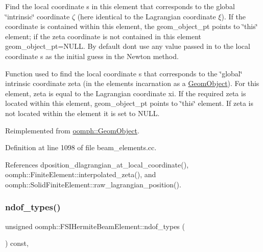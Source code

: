 Find the local coordinate s in this element that corresponds to the global \char`\"{}intrinsic\char`\"{} coordinate $ \zeta $ (here identical to the Lagrangian coordinate $ \xi $). If the coordinate is contained within this element, the geom\+\_\+object\+\_\+pt points to \char`\"{}this\char`\"{} element; if the zeta coordinate is not contained in this element geom\+\_\+object\+\_\+pt=N\+U\+LL. By default don\textquotesingle{}t use any value passed in to the local coordinate s as the initial guess in the Newton method. 

Function used to find the local coordinate s that corresponds to the \char`\"{}global\char`\"{} intrinsic coordinate zeta (in the element\textquotesingle{}s incarnation as a \hyperlink{classoomph_1_1GeomObject}{Geom\+Object}). For this element, zeta is equal to the Lagrangian coordinate xi. If the required zeta is located within this element, geom\+\_\+object\+\_\+pt points to \char`\"{}this\char`\"{} element. If zeta is not located within the element it is set to N\+U\+LL. 

Reimplemented from \hyperlink{classoomph_1_1GeomObject_a78ee9f98bcfd0c5e1f07a459777663d3}{oomph\+::\+Geom\+Object}.



Definition at line 1098 of file beam\+\_\+elements.\+cc.



References dposition\+\_\+dlagrangian\+\_\+at\+\_\+local\+\_\+coordinate(), oomph\+::\+Finite\+Element\+::interpolated\+\_\+zeta(), and oomph\+::\+Solid\+Finite\+Element\+::raw\+\_\+lagrangian\+\_\+position().

\mbox{\label{classoomph_1_1FSIHermiteBeamElement_a61ce78842e8e4d60b9f015eee813e162}} 
\subsubsection{\texorpdfstring{ndof\+\_\+types()}{ndof\_types()}}
{\footnotesize\ttfamily unsigned oomph\+::\+F\+S\+I\+Hermite\+Beam\+Element\+::ndof\+\_\+types (\begin{DoxyParamCaption}{ }\end{DoxyParamCaption}) const\hspace{0.3cm}{\ttfamily [inline]}, {\ttfamily [virtual]}}



